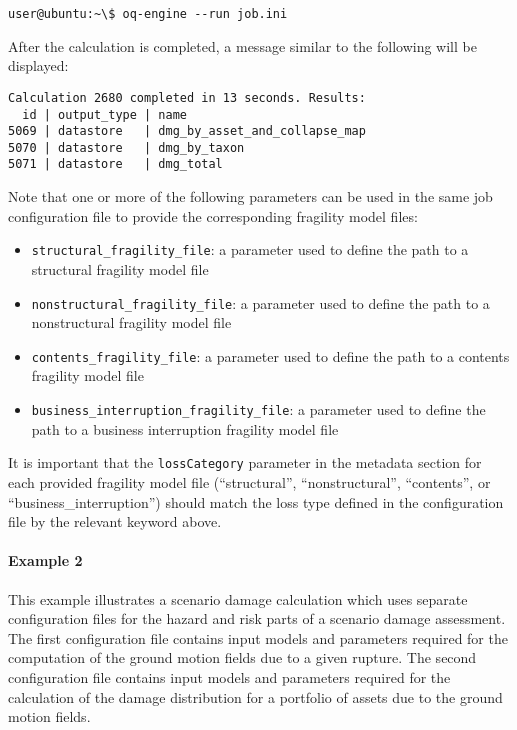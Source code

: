 \begin{verbatim}
user@ubuntu:~\$ oq-engine --run job.ini
\end{verbatim}

After the calculation is completed, a message similar to the following will be
displayed:

\begin{verbatim}
Calculation 2680 completed in 13 seconds. Results:
  id | output_type | name
5069 | datastore   | dmg_by_asset_and_collapse_map
5070 | datastore   | dmg_by_taxon
5071 | datastore   | dmg_total
\end{verbatim}

Note that one or more of the following parameters can be used in the same job
configuration file to provide the corresponding fragility model files:

\begin{itemize}

  \item \Verb+structural_fragility_file+: a parameter used to define the path
    to a structural \gls{fragility model} file

  \item \Verb+nonstructural_fragility_file+: a parameter used to define the path
    to a nonstructural \gls{fragility model} file

  \item \Verb+contents_fragility_file+: a parameter used to define the path
    to a contents \gls{fragility model} file

  \item \Verb+business_interruption_fragility_file+: a parameter used to define
    the path to a business interruption \gls{fragility model} file

\end{itemize}

It is important that the \Verb+lossCategory+ parameter in the metadata section
for each provided fragility model file (``structural'', ``nonstructural'',
``contents'', or ``business\_interruption'') should match the loss type
defined in the configuration file by the relevant keyword above.


\paragraph{Example 2}

This example illustrates a scenario damage calculation which uses separate
configuration files for the hazard and risk parts of a scenario damage
assessment. The first configuration file contains input models and parameters
required for the computation of the ground motion fields due to a given
rupture. The second configuration file contains input models and parameters
required for the calculation of the damage distribution for a portfolio of
assets due to the ground motion fields.

